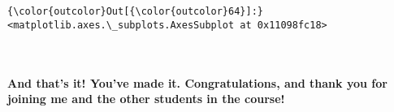 \documentclass[11pt]{article}
\begin{document}
\begin{Verbatim}[commandchars=\\\{\}]
{\color{outcolor}Out[{\color{outcolor}64}]:} <matplotlib.axes.\_subplots.AxesSubplot at 0x11098fc18>
\end{Verbatim}
            
    \begin{center}
    \end{center}
    { \hspace*{\fill} \\}
    
    \hypertarget{and-thats-it-youve-made-it.-congratulations-and-thank-you-for-joining-me-and-the-other-students-in-the-course}{%
\paragraph{And that's it! You've made it. Congratulations, and thank you
for joining me and the other students in the
course!}\label{and-thats-it-youve-made-it.-congratulations-and-thank-you-for-joining-me-and-the-other-students-in-the-course}}


    
    
    
    
\end{document}
